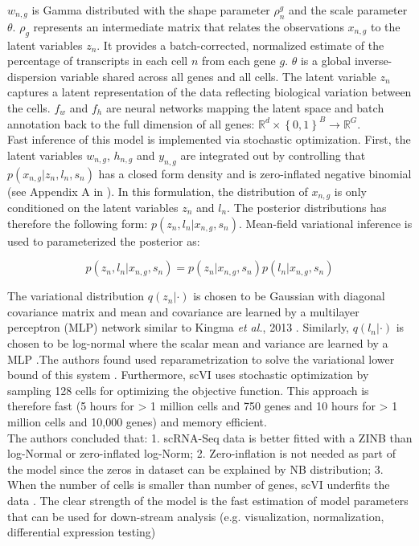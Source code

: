 $w_{n,g}$ is Gamma distributed with the shape parameter $\rho_n^g$ and the scale parameter $\theta$. $\rho_g$ represents an intermediate matrix that relates the observations $x_{n,g}$ to the latent variables $z_n$. It provides a batch-corrected, normalized estimate of the percentage of transcripts in each cell $n$ from each gene $g$. $\theta$ is a global inverse-dispersion variable shared across all genes and all cells. The latent variable $z_n$ captures a latent representation of the data reflecting biological variation between the cells. $f_w$ and $f_h$ are neural networks mapping the latent space and batch annotation back to the full dimension of all genes: $\mathbb{R}^d\times{}\left\lbrace0,1\right\rbrace^B\rightarrow\mathbb{R}^G$.\\

Fast inference of this model is implemented via stochastic optimization. First, the latent variables $w_{n,g}$, $h_{n,g}$ and $y_{n,g}$ are integrated out by controlling that $p(x_{n,g}|z_n,l_n,s_n)$ has a closed form density and is zero-inflated negative binomial (see Appendix A in \citep{Lopez2018}). In this formulation, the distribution of $x_{n,g}$ is only conditioned on the latent variables $z_n$ and $l_n$. The posterior distributions has therefore the following form: $p(z_n,l_n|x_{n,g},s_n)$. Mean-field variational inference is used to parameterized the posterior as:

\begin{equation}
p(z_n,l_n|x_{n,g},s_n)=p(z_n|x_{n,g},s_n)p(l_n|x_{n,g},s_n)
\end{equation} 

The variational distribution $q(z_n|\cdot)$ is chosen to be Gaussian with diagonal covariance matrix and mean and covariance are learned by a multilayer perceptron (MLP) network similar to Kingma \emph{et al.}, 2013 \citep{Kingma2013}. Similarly, $q(l_n|\cdot)$ is chosen to be log-normal where the scalar mean and variance are learned by a MLP \citep{Kingma2013}.The authors found used reparametrization to solve the variational lower bound of this system \cite{Lopez2018, Kingma2013}. Furthermore, scVI uses stochastic optimization by sampling 128 cells for optimizing the objective function. This approach is therefore fast (5 hours for > 1 million cells and 750 genes and 10 hours for > 1 million cells and 10,000 genes) and memory efficient. \\

The authors concluded that: 1. scRNA-Seq data is better fitted with a ZINB than log-Normal or zero-inflated log-Norm; 2. Zero-inflation is not needed as part of the model since the zeros in dataset can be explained by NB distribution; 3. When the number of cells is smaller than number of genes, scVI underfits the data \citep{Lopez2018}. The clear strength of the model is the fast estimation of model parameters that can be used for down-stream analysis (e.g. visualization, normalization, differential expression testing)
 

